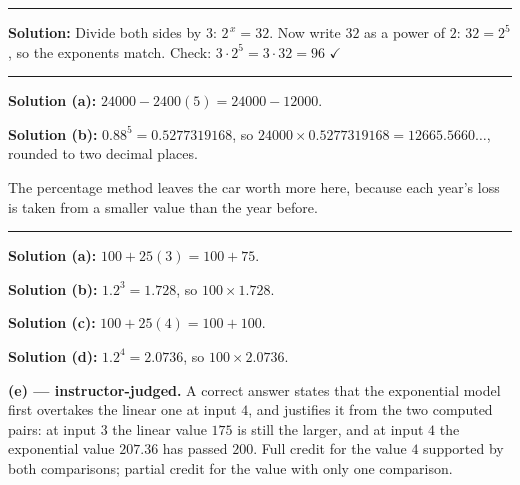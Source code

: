 \documentclass[12pt]{article}
\begin{document}
\vspace{0.2cm}\noindent\rule{\linewidth}{0.2pt}


\textbf{Solution:} Divide both sides by $3$: $2^{\,x} = 32$. Now write $32$ as a power of $2$: $32 = 2^5$, so the exponents match. Check: $3 \cdot 2^5 = 3 \cdot 32 = 96$ $\checkmark$ 

\vspace{0.2cm}\noindent\rule{\linewidth}{0.2pt}


\textbf{Solution (a):} $24000 - 2400(5) = 24000 - 12000$. 

\textbf{Solution (b):} $0.88^5 = 0.5277319168$, so $24000 \times 0.5277319168 = 12665.5660\ldots$, rounded to two decimal places. 

The percentage method leaves the car worth more here, because each year's loss is taken from a smaller value than the year before.

\vspace{0.2cm}\noindent\rule{\linewidth}{0.2pt}


\textbf{Solution (a):} $100 + 25(3) = 100 + 75$. 

\textbf{Solution (b):} $1.2^3 = 1.728$, so $100 \times 1.728$. 

\textbf{Solution (c):} $100 + 25(4) = 100 + 100$. 

\textbf{Solution (d):} $1.2^4 = 2.0736$, so $100 \times 2.0736$. 

\textbf{(e) --- instructor-judged.} A correct answer states that the exponential model first overtakes the linear one at input $4$, and justifies it from the two computed pairs: at input $3$ the linear value $175$ is still the larger, and at input $4$ the exponential value $207.36$ has passed $200$. Full credit for the value $4$ supported by both comparisons; partial credit for the value with only one comparison.
\end{document}
